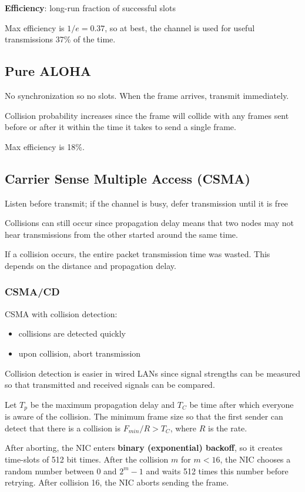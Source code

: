 \documentclass[11pt]{article}
\begin{document}
\textbf{Efficiency}: long-run fraction of successful slots

Max efficiency is \(1/e = 0.37\), so at best, the channel is used for useful transmissions 37\% of the time.
\subsection{Pure ALOHA}
\label{sec:org4c91305}
No synchronization so no slots.
When the frame arrives, transmit immediately.

Collision probability increases since the frame will collide with any frames sent before or after it
within the time it takes to send a single frame.

Max efficiency is 18\%.
\subsection{Carrier Sense Multiple Access (CSMA)}
\label{sec:orgee26b30}
Listen before transmit; if the channel is busy, defer transmission until it is free

Collisions can still occur since propagation delay means that two nodes may not hear transmissions
from the other started around the same time.

If a collision occurs, the entire packet transmission time was wasted.
This depends on the distance and propagation delay.
\subsubsection{CSMA/CD}
\label{sec:org2501638}
CSMA with collision detection:
\begin{itemize}
\item collisions are detected quickly
\item upon collision, abort transmission
\end{itemize}

Collision detection is easier in wired LANs since signal strengths can be measured so that transmitted
and received signals can be compared.

Let \(T_{p}\) be the maximum propagation delay and \(T_{C}\) be time after which everyone is
aware of the collision.
The minimum frame size so that the first sender can detect that there is a collision is
\(F_{min}/R > T_{C}\), where \(R\) is the rate.

After aborting, the NIC enters \textbf{binary (exponential) backoff}, so it creates time-slots of 512 bit times.
After the collision \(m\) for \(m < 16\), the NIC chooses a random number between 0 and \(2^{m} - 1\)
and waits 512 times this number before retrying.
After collision 16, the NIC aborts sending the frame.
\end{document}
